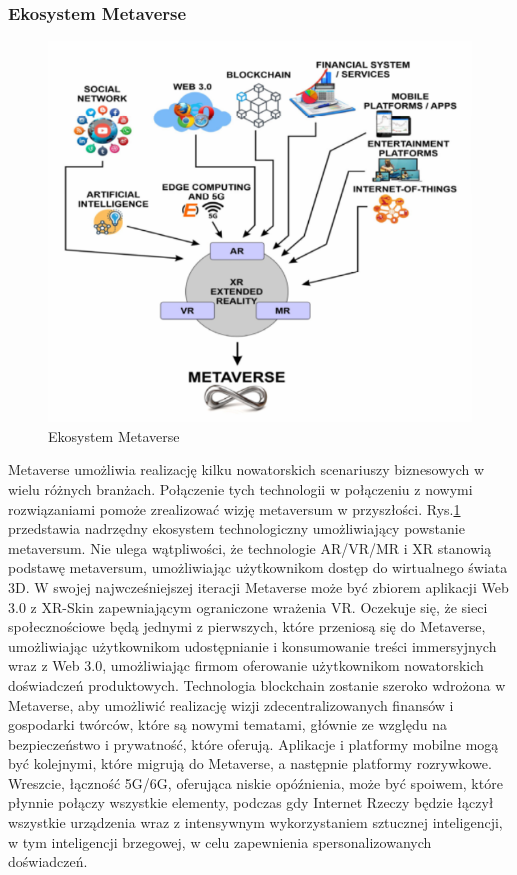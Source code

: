 \subsubsection{Ekosystem Metaverse}

\begin{figure}[!htbp]
    \centering
    \includegraphics[width=\textwidth]{images/metaverse/metaverseEcosystem.png}
    \caption{Ekosystem Metaverse\cite{metaverseSecurityIssuesChallengesAndViableZTAModel}}
    \label{metaverseEcosystemImage}
\end{figure}

Metaverse umożliwia realizację kilku nowatorskich scenariuszy biznesowych w wielu różnych branżach. Połączenie tych technologii w połączeniu z nowymi rozwiązaniami pomoże zrealizować wizję metaversum w przyszłości. Rys.\ref{metaverseEcosystemImage} przedstawia nadrzędny ekosystem technologiczny umożliwiający powstanie metaversum. Nie ulega wątpliwości, że technologie AR/VR/MR i XR stanowią podstawę metaversum, umożliwiając użytkownikom dostęp do wirtualnego świata 3D. W swojej najwcześniejszej iteracji Metaverse może być zbiorem aplikacji Web 3.0 z XR-Skin zapewniającym ograniczone wrażenia VR. Oczekuje się, że sieci społecznościowe będą jednymi z pierwszych, które przeniosą się do Metaverse, umożliwiając użytkownikom udostępnianie i konsumowanie treści immersyjnych wraz z Web 3.0, umożliwiając firmom oferowanie użytkownikom nowatorskich doświadczeń produktowych. Technologia blockchain zostanie szeroko wdrożona w Metaverse, aby umożliwić realizację wizji zdecentralizowanych finansów i gospodarki twórców, które są nowymi tematami, głównie ze względu na bezpieczeństwo i prywatność, które oferują. Aplikacje i platformy mobilne mogą być kolejnymi, które migrują do Metaverse, a następnie platformy rozrywkowe. Wreszcie, łączność 5G/6G, oferująca niskie opóźnienia, może być spoiwem, które płynnie połączy wszystkie elementy, podczas gdy Internet Rzeczy będzie łączył wszystkie urządzenia wraz z intensywnym wykorzystaniem sztucznej inteligencji, w tym inteligencji brzegowej, w celu zapewnienia spersonalizowanych doświadczeń\cite{metaverseSecurityIssuesChallengesAndViableZTAModel}.


